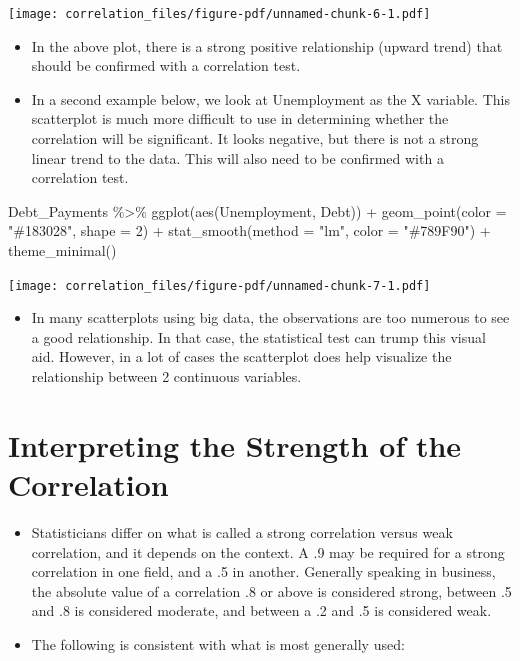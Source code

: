 \documentclass[
  letterpaper,
  DIV=11,
  numbers=noendperiod]{scrreprt}
\newenvironment{Shaded}{\begin{snugshade}}{\end{snugshade}}
\newcommand{\AttributeTok}[1]{\textcolor[rgb]{0.40,0.45,0.13}{#1}}
\newcommand{\DecValTok}[1]{\textcolor[rgb]{0.68,0.00,0.00}{#1}}
\newcommand{\FunctionTok}[1]{\textcolor[rgb]{0.28,0.35,0.67}{#1}}
\newcommand{\NormalTok}[1]{\textcolor[rgb]{0.00,0.23,0.31}{#1}}
\newcommand{\SpecialCharTok}[1]{\textcolor[rgb]{0.37,0.37,0.37}{#1}}
\newcommand{\StringTok}[1]{\textcolor[rgb]{0.13,0.47,0.30}{#1}}
\providecommand{\tightlist}{%
  \setlength{\itemsep}{0pt}\setlength{\parskip}{0pt}}\usepackage{longtable,booktabs,array}
\begin{document}
\texttt{[image: correlation\_files/figure-pdf/unnamed-chunk-6-1.pdf]}

\begin{itemize}
\item
  In the above plot, there is a strong positive relationship (upward
  trend) that should be confirmed with a correlation test.
\item
  In a second example below, we look at Unemployment as the X variable.
  This scatterplot is much more difficult to use in determining whether
  the correlation will be significant. It looks negative, but there is
  not a strong linear trend to the data. This will also need to be
  confirmed with a correlation test.
\end{itemize}

\begin{Shaded}
\begin{Highlighting}[]
\NormalTok{Debt\_Payments }\SpecialCharTok{\%\textgreater{}\%}
    \FunctionTok{ggplot}\NormalTok{(}\FunctionTok{aes}\NormalTok{(Unemployment, Debt)) }\SpecialCharTok{+} \FunctionTok{geom\_point}\NormalTok{(}\AttributeTok{color =} \StringTok{"\#183028"}\NormalTok{, }\AttributeTok{shape =} \DecValTok{2}\NormalTok{) }\SpecialCharTok{+}
    \FunctionTok{stat\_smooth}\NormalTok{(}\AttributeTok{method =} \StringTok{"lm"}\NormalTok{, }\AttributeTok{color =} \StringTok{"\#789F90"}\NormalTok{) }\SpecialCharTok{+} \FunctionTok{theme\_minimal}\NormalTok{()}
\end{Highlighting}
\end{Shaded}

\texttt{[image: correlation\_files/figure-pdf/unnamed-chunk-7-1.pdf]}

\begin{itemize}
\tightlist
\item
  In many scatterplots using big data, the observations are too numerous
  to see a good relationship. In that case, the statistical test can
  trump this visual aid. However, in a lot of cases the scatterplot does
  help visualize the relationship between 2 continuous variables.
\end{itemize}

\section{Interpreting the Strength of the
Correlation}\label{interpreting-the-strength-of-the-correlation}

\begin{itemize}
\tightlist
\item
  Statisticians differ on what is called a strong correlation versus
  weak correlation, and it depends on the context. A .9 may be required
  for a strong correlation in one field, and a .5 in another. Generally
  speaking in business, the absolute value of a correlation .8 or above
  is considered strong, between .5 and .8 is considered moderate, and
  between a .2 and .5 is considered weak.
\item
  The following is consistent with what is most generally used:
\end{itemize}
\end{document}
